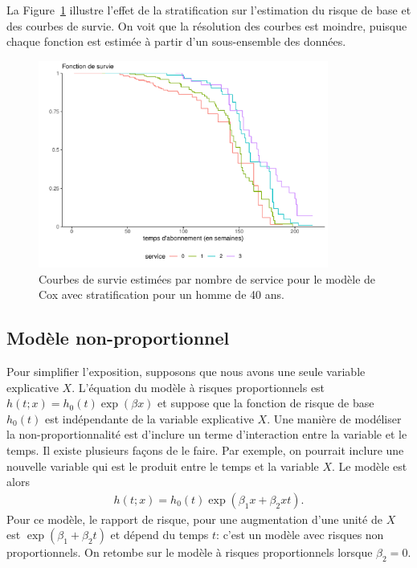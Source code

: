 \documentclass[
  11pt,
  letterpaper,
]{scrbook}
\theoremstyle{definition}
\theoremstyle{remark}
\begin{document}
La Figure~\ref{fig-courbesurviesstrat} illustre l'effet de la
stratification sur l'estimation du risque de base et des courbes de
survie. On voit que la résolution des courbes est moindre, puisque
chaque fonction est estimée à partir d'un sous-ensemble des données.

\begin{figure}[ht!]

{\centering \includegraphics[width=0.85\textwidth,height=\textheight]{survie_files/figure-pdf/fig-courbesurviesstrat-1.pdf}

}

\caption{\label{fig-courbesurviesstrat}Courbes de survie estimées par
nombre de service pour le modèle de Cox avec stratification pour un
homme de 40 ans.}

\end{figure}

\hypertarget{moduxe8le-non-proportionnel}{%
\subsection{Modèle
non-proportionnel}\label{moduxe8le-non-proportionnel}}

Pour simplifier l'exposition, supposons que nous avons une seule
variable explicative \(X\). L'équation du modèle à risques
proportionnels est \(h(t; x) = h_0(t)\exp(\beta x)\) et suppose que la
fonction de risque de base \(h_0(t)\) est indépendante de la variable
explicative \(X\). Une manière de modéliser la non-proportionnalité est
d'inclure un terme d'interaction entre la variable et le temps. Il
existe plusieurs façons de le faire. Par exemple, on pourrait inclure
une nouvelle variable qui est le produit entre le temps et la variable
\(X\). Le modèle est alors \begin{align*}
h(t; x) = h_0(t) \exp(\beta_1x + \beta_2xt).
\end{align*} Pour ce modèle, le rapport de risque, pour une augmentation
d'une unité de \(X\) est \(\exp(\beta_1+ \beta_2t)\) et dépend du temps
\(t\): c'est un modèle avec risques non proportionnels. On retombe sur
le modèle à risques proportionnels lorsque \(\beta_2=0\).
\end{document}
